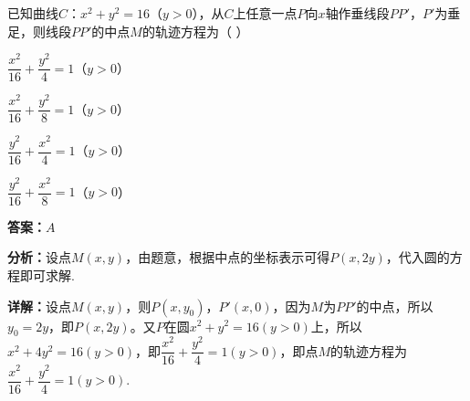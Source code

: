 \begin{question}[points=5]
已知曲线$C：x^2+y^2=16$（$y>0$），从$C$上任意一点$P$向$x$轴作垂线段$PP'$，$P'$为垂足，则线段$PP'$的中点$M$的轨迹方程为（ ）
\begin{choices}
  \item $\dfrac{x^2}{16}+\dfrac{y^2}{4}=1$（$y>0$）
  \item $\dfrac{x^2}{16}+\dfrac{y^2}{8}=1$（$y>0$）
  \item $\dfrac{y^2}{16}+\dfrac{x^2}{4}=1$（$y>0$）
  \item $\dfrac{y^2}{16}+\dfrac{x^2}{8}=1$（$y>0$）
\end{choices}
\begin{solution}
\textbf{答案：}$A$

\textbf{分析：}设点$M(x,y)$，由题意，根据中点的坐标表示可得$P(x,2y)$，代入圆的方程即可求解.

\textbf{详解：}设点$M(x,y)$，则$P(x,y_0)$，$P'(x,0)$，因为$M$为$PP'$的中点，所以$y_0=2y$，即$P(x,2y)$。又$P$在圆$x^2+y^2=16(y>0)$上，所以$x^2+4y^2=16(y>0)$，即$\dfrac{x^2}{16}+\dfrac{y^2}{4}=1(y>0)$，即点$M$的轨迹方程为$\dfrac{x^2}{16}+\dfrac{y^2}{4}=1(y>0)$.
\end{solution}
\end{question}

